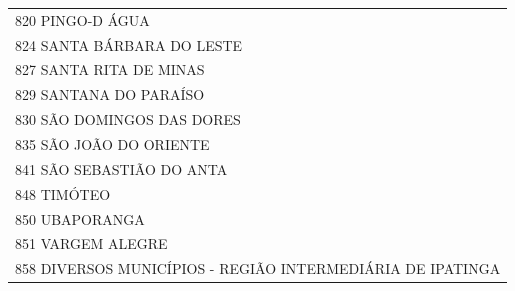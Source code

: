 \documentclass{article}
\begin{document}
\begin{longtable}[c]{m{18cm}}
\multicolumn{1}{l}{ \hspace{2em} 820 PINGO-D ÁGUA } \\
\multicolumn{1}{l}{ \hspace{2em} 824 SANTA BÁRBARA DO LESTE } \\
\multicolumn{1}{l}{ \hspace{2em} 827 SANTA RITA DE MINAS } \\
\multicolumn{1}{l}{ \hspace{2em} 829 SANTANA DO PARAÍSO } \\
\multicolumn{1}{l}{ \hspace{2em} 830 SÃO DOMINGOS DAS DORES } \\
\multicolumn{1}{l}{ \hspace{2em} 835 SÃO JOÃO DO ORIENTE } \\
\multicolumn{1}{l}{ \hspace{2em} 841 SÃO SEBASTIÃO DO ANTA } \\
\multicolumn{1}{l}{ \hspace{2em} 848 TIMÓTEO } \\
\multicolumn{1}{l}{ \hspace{2em} 850 UBAPORANGA } \\
\multicolumn{1}{l}{ \hspace{2em} 851 VARGEM ALEGRE } \\
\multicolumn{1}{l}{ \hspace{2em} 858 DIVERSOS MUNICÍPIOS - REGIÃO INTERMEDIÁRIA DE IPATINGA } \\
\end{longtable}
\newpage
\end{document}
